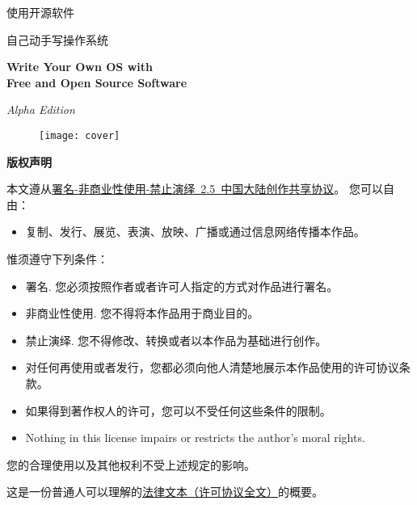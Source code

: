 \begin{center}
\Huge 使用开源软件

\fontsize{48}{52}\selectfont 自己动手写操作系统

\bf\sc\Huge Write Your Own OS with\\ Free and Open Source Software

\it\LARGE Alpha Edition

\end{center}
\vskip 1cm
\begin{figure}[htbp]
 \centering
\texttt{[image: cover]}
\end{figure}

\noindent{}
\noindent{}
\clearpage

\begin{lined}{\textwidth}\vspace{2ex}
\begin{center}
\bf\Large 版权声明
\end{center}
\vspace{2ex}
\end{lined}

\normalsize
本文遵从\href{http://creativecommons.org/licenses/by-nc-nd/2.5/cn/}{署名-非商业性使用-禁止演绎~2.5~中国大陆创作共享协议}。
\vskip 1cm
\noindent
\large 您可以自由：
\normalsize
\begin{itemize}
\item 复制、发行、展览、表演、放映、广播或通过信息网络传播本作品。
\end{itemize}

\noindent
\large 惟须遵守下列条件：
\normalsize
\begin{itemize}
\item{署名.} 您必须按照作者或者许可人指定的方式对作品进行署名。
\item{非商业性使用.} 您不得将本作品用于商业目的。
\item{禁止演绎.} 您不得修改、转换或者以本作品为基础进行创作。
\item 对任何再使用或者发行，您都必须向他人清楚地展示本作品使用的许可协议条款。
\item 如果得到著作权人的许可，您可以不受任何这些条件的限制。
\item Nothing in this license impairs or restricts the author's moral rights.
\end{itemize}
\vskip 1cm
\normalsize
\begin{center}
您的合理使用以及其他权利不受上述规定的影响。

这是一份普通人可以理解的\href{http://creativecommons.org/licenses/by-nc-nd/2.5/cn/legalcode}{法律文本（许可协议全文）}的概要。 
\end{center}

